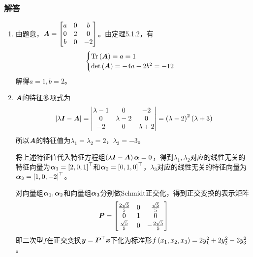 \documentclass{beamer}
\begin{document}
\begin{frame}[allowframebreaks]
    \frametitle{解答}
    \begin{enumerate}
        \item {
              由题意，\(\boldsymbol{A}=\begin{bmatrix}a&0&b\\0&2&0\\b&0&-2\end{bmatrix}\)。由定理5.1.2，有
              \begin{equation*}
                  \begin{cases}
                      \mathrm{Tr}\left( \boldsymbol{A} \right)=a=1 \\
                      \mathrm{det}\left( \boldsymbol{A} \right)=-4a-2b^2=-12
                  \end{cases}
              \end{equation*}
              解得\(a=1,b=2\)。
              }
        \item {
              \(\boldsymbol{A}\)的特征多项式为
              \begin{equation*}
                  \left|\lambda\boldsymbol{I}-\boldsymbol{A} \right|=\begin{vmatrix}\lambda-1&0&-2\\0&\lambda-2&0\\-2&0&\lambda+2\end{vmatrix}=\left( \lambda-2 \right)^2\left( \lambda+3 \right)
              \end{equation*}
              所以\(\boldsymbol{A}\)的特征值为\(\lambda_1=\lambda_2=2\)，\(\lambda_3=-3\)。

              将上述特征值代入特征方程组\(\left( \lambda\boldsymbol{I}-\boldsymbol{A} \right)\boldsymbol{\alpha}=0\)，得到\(\lambda_1,\lambda_2\)对应的线性无关的特征向量为\(\boldsymbol{\alpha}_1=\left[ 2,0,1 \right]^\top\)和\(\boldsymbol{\alpha}_2=\left[ 0,1,0 \right]^\top\)，\(\lambda_3\)对应的线性无关的特征向量为\(\boldsymbol{\alpha}_3=\left[ 1,0,-2 \right]^\top\)。

              对向量组\(\boldsymbol{\alpha}_1,\boldsymbol{\alpha}_2\)和向量组\(\boldsymbol{\alpha}_3\)分别做Schmidt正交化，得到正交变换的表示矩阵
              \begin{equation*}
                  \boldsymbol{P}=
                  \begin{bmatrix}
                      \frac{2\sqrt{5}}{5} & 0 & \frac{\sqrt{5}}{5}   \\
                      0                   & 1 & 0                    \\
                      \frac{\sqrt{5}}{5}  & 0 & -\frac{2\sqrt{5}}{5}
                  \end{bmatrix}
              \end{equation*}
              即二次型\(f\)在正交变换\(\boldsymbol{y}=\boldsymbol{P}^\top\boldsymbol{x}\)下化为标准形\(f\left( x_1,x_2,x_3 \right)=2y_1^2+2y_2^2-3y_3^2\)。
              }
    \end{enumerate}
\end{frame}
\end{document}
